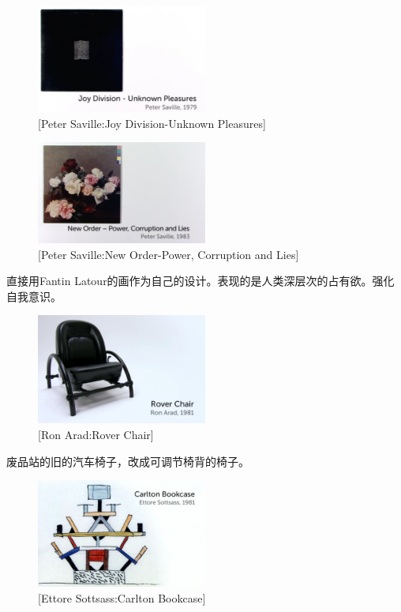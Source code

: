 \documentclass[UTF8]{../../../../RepresentationUniverse}
\begin{document}
\begin{figure}[h]
    \centering
    \includegraphics[width=0.5\textwidth]{./src/figures/Joy Division-Unknown Pleasures_2023-04-09_21-11-12.png}
    \caption{[Peter Saville:Joy Division-Unknown Pleasures]}
    \label{figure:Joy Division-Unknown Pleasures}
\end{figure}


\begin{figure}[h]
    \centering
    \includegraphics[width=0.5\textwidth]{./src/figures/New Order-Power, Corruption and Lies_2023-04-09_21-12-41.png}
    \caption{[Peter Saville:New Order-Power, Corruption and Lies]}
    \label{figure:New Order-Power, Corruption and Lies}
\end{figure}
直接用Fantin Latour的画作为自己的设计。表现的是人类深层次的占有欲。强化自我意识。

\begin{figure}[h]
    \centering
    \includegraphics[width=0.5\textwidth]{./src/figures/Rover Chair_2023-04-09_21-16-06.png}
    \caption{[Ron Arad:Rover Chair]}
    \label{figure:Rover Chair}
\end{figure}
废品站的旧的汽车椅子，改成可调节椅背的椅子。

\begin{figure}[h]
    \centering
    \includegraphics[width=0.5\textwidth]{./src/figures/Carlton Bookcase_2023-04-09_21-18-44.png}
    \caption{[Ettore Sottsass:Carlton Bookcase]}
    \label{figure:Carlton Bookcase}
\end{figure}
\end{document}
